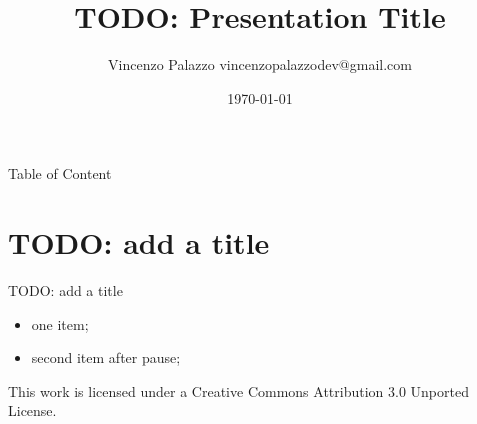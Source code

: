 \documentclass[aspectratio=43,11p, handout]{beamer}
\title{TODO: Presentation Title}
\date{\today}
\author{Vincenzo Palazzo vincenzopalazzodev@gmail.com}
\institute{https://github.com/vincenzopalazzo}
\begin{document}
  \maketitle

  \begin{frame}{Table of Content}
    \tableofcontents
  \end{frame}

  \section{TODO: add a title}

  \begin{frame}{TODO: add a title}
    \begin{itemize}
    \item one item;
    \item \pause second item after pause;
    \end{itemize}
  \end{frame}

  \begin{frame}[standout]
    \begin{mdframed}[outerlinecolor=black,outerlinewidth=2pt,linecolor=cccolor,middlelinewidth=3pt,roundcorner=10pt]
      This work is licensed under a Creative Commons Attribution 3.0 Unported License.
      \faCreativeCommons\ \faCreativeCommonsBy\ \faCreativeCommonsSa
    \end{mdframed}
  \end{frame}
\end{document}
